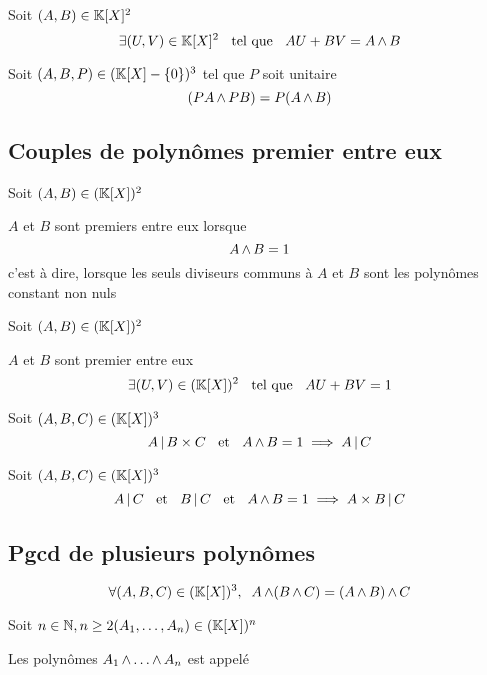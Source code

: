 \begin{prp}[Bézout]
  Soit $(A, B) \in \mathbb{K}[X]^2$
  \[
    \exists (U, V) \in \mathbb{K}[X]^2 \;\;\text{ tel que }\;\; A U + B V = A \operatorname{\wedge} B
  \]
\end{prp}

\begin{prp}
  Soit $(A, B, P) \in (\mathbb{K}[X] - \{0\})^3$ tel que $P$ soit unitaire
  \[
    (P A \operatorname{\wedge} P B) = P (A \operatorname{\wedge} B)
  \]
\end{prp}

\subsection{Couples de polynômes premier entre eux}

\begin{dfn}
Soit $(A, B) \in (\mathbb{K}[X])^2$

$A$ et $B$ sont premiers entre eux lorsque
\[
    A \operatorname{\wedge} B = 1
\]
c'est à dire, lorsque les seuls diviseurs communs à $A$ et $B$ sont les
polynômes constant non nuls
\end{dfn}

\begin{thm}[Bézout]
Soit $(A, B) \in (\mathbb{K}[X])^2$

$A$ et $B$ sont premier entre eux \ssi
\[
    \exists (U, V) \in (\mathbb{K}[X])^2 \;\;\text{ tel que }\;\; A U + B V = 1
\]
\end{thm}

\begin{thm}
Soit $(A, B, C) \in (\mathbb{K}[X])^3$
\[
    A \operatorname{|} B \times C \;\;\text{ et }\;\; A \operatorname{\wedge} B = 1 \implies A \operatorname{|} C
\]
\end{thm}

\begin{prp}
Soit $(A, B, C) \in (\mathbb{K}[X])^3$
\[
    A \operatorname{|} C \;\;\text{ et }\;\; B \operatorname{|} C \;\;\text{ et }\;\; A \operatorname{\wedge} B = 1 \implies A \times B
    \operatorname{|} C
\]
\end{prp}

\subsection{Pgcd de plusieurs polynômes}

\begin{prp}
\[
    \forall (A, B, C) \in (\mathbb{K}[X])^3, \;\;
    A \operatorname{\wedge} (B \operatorname{\wedge} C) = (A \operatorname{\wedge} B) \operatorname{\wedge} C
\]
\end{prp}

\begin{dfn}
Soit $n \in \mathbb{N}, n \geq 2 (A_1, \ldots, A_n) \in (\mathbb{K}[X])^n$

Les polynômes $A_1 \operatorname{\wedge} \ldots \operatorname{\wedge} A_n$ est appelé
\end{dfn}

